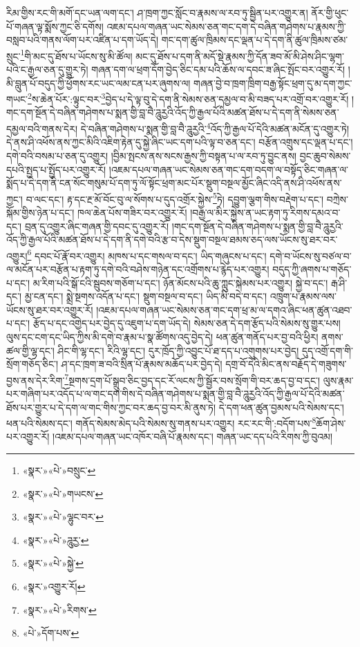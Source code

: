 རིམ་གྱིས་རང་གི་མགོ་དང་ཡན་ལག་དང་། ཤ་ཁྲག་ཀྱང་སློང་བ་རྣམས་ལ་རབ་ཏུ་སྦྱིན་པར་འགྱུར་ན། ནོར་གྱི་ཕུང་པོ་གཞན་ལྟ་སྨོས་ཀྱང་ཅི་དགོས། འཇམ་དཔལ་གཞན་ཡང་སེམས་ཅན་གང་དག་དེ་བཞིན་གཤེགས་པ་རྣམས་ཀྱི་བསླབ་པའི་གནས་ལོག་པར་འཛིན་པ་དག་ཡོད་དེ། གང་དག་ཚུལ་ཁྲིམས་དང་ལྡན་པ་དེ་དག་ནི་ཚུལ་ཁྲིམས་ཙམ་སྲུང་\footnote{«སྣར་»«པེ་»བསྲུང་}གི་མང་དུ་ཐོས་པ་ཡོངས་སུ་མི་ཚོལ། མང་དུ་ཐོས་པ་དག་ནི་མདོ་སྡེ་རྣམས་ཀྱི་དོན་ཟབ་མོ་མི་ཤེས་ཤིང་ལྷག་པའི་ང་རྒྱལ་ཅན་དུ་གྱུར་ཏེ། གཞན་དག་ལ་ཕྲག་དོག་བྱེད་ཅིང་དམ་པའི་ཆོས་ལ་དབང་ཟ་ཞིང་སྤོང་བར་འགྱུར་རོ། །མི་བླུན་པོ་བདུད་ཀྱི་ཕྱོགས་རང་ཡང་ལམ་ངན་པར་ཞུགས་ལ། གཞན་བྱེ་བ་ཁྲག་ཁྲིག་བརྒྱ་སྟོང་ཕྲག་དུ་མ་དག་ཀྱང་གཡང་\footnote{«སྣར་»«པེ་»གཡངས་}ས་ཆེན་པོར་:ལྟུང་བར་\footnote{«སྣར་»«པེ་»ལྷུང་བར་}བྱེད་པ་དེ་ལྟ་བུ་དེ་དག་ནི་སེམས་ཅན་དམྱལ་བ་མི་བཟད་པར་འགྲོ་བར་འགྱུར་རོ། །གང་དག་སྔོན་དེ་བཞིན་གཤེགས་པ་སྨན་གྱི་བླ་བཻ་ཌཱུརྱའི་འོད་ཀྱི་རྒྱལ་པོའི་མཚན་ཐོས་པ་དེ་དག་ནི་སེམས་ཅན་དམྱལ་བའི་གནས་དེར། དེ་བཞིན་གཤེགས་པ་སྨན་གྱི་བླ་བཻ་ཌཱུརྱའི་\footnote{«སྣར་»«པེ་»ཌཱུརྱ་}འོད་ཀྱི་རྒྱལ་པོ་དེའི་མཚན་མངོན་དུ་འགྱུར་ཏེ། དེ་ནས་ཤི་འཕོས་ནས་ཀྱང་མིའི་འཇིག་རྟེན་དུ་སྐྱེ་ཞིང་ཡང་དག་པའི་ལྟ་བ་ཅན་དང་། བརྩོན་འགྲུས་དང་ལྡན་པ་དང་། དགེ་བའི་བསམ་པ་ཅན་དུ་འགྱུར། །བྱིམ་སྤངས་ནས་སངས་རྒྱས་ཀྱི་བསྟན་པ་ལ་རབ་ཏུ་བྱུང་ནས། བྱང་ཆུབ་སེམས་དཔའི་སྤྱད་པ་སྤྱོད་པར་འགྱུར་རོ། །འཇམ་དཔལ་གཞན་ཡང་སེམས་ཅན་གང་དག་བདག་ལ་བསྟོད་ཅིང་གཞན་ལ་སྨོད་པ་དེ་དག་ནི་ངན་སོང་གསུམ་པོ་དག་ཏུ་ལོ་སྟོང་ཕྲག་མང་པོར་སྡུག་བསྔལ་མྱོང་ཞིང་འདི་ནས་ཤི་འཕོས་ནས་ཀྱང་། བ་ལང་དང་། རྟ་དང་རྔ་མོ་བོང་བུ་ལ་སོགས་པ་དུད་འགྲོར་སྐྱེས་\footnote{«སྣར་»«པེ་»སྐྱེ་}ཏེ། དབྱུག་ལྕག་གིས་བརྡེག་པ་དང་། བཀྲེས་སྐོམ་གྱིས་ཉེན་པ་དང་། ཁལ་ཆེན་པོས་གཟིར་བར་འགྱུར་རོ། །བརྒྱ་ལ་མིར་སྐྱེས་ན་ཡང་རྟག་ཏུ་རིགས་དམའ་བ་དང་། བྲན་དུ་འགྱུར་ཞིང་གཞན་གྱི་དབང་དུ་འགྱུར་རོ། །གང་དག་སྔོན་དེ་བཞིན་གཤེགས་པ་སྨན་གྱི་བླ་བཻ་ཌཱུརྱའི་འོད་ཀྱི་རྒྱལ་པོའི་མཚན་ཐོས་པ་དེ་དག་ནི་དགེ་བའི་རྩ་བ་དེས་སྡུག་བསྔལ་ཐམས་ཅད་ལས་ཡོངས་སུ་ཐར་བར་འགྱུར།\footnote{«སྣར་»འགྱུར་རོ།} དབང་པོ་རྣོ་བར་འགྱུར། མཁས་པ་དང་གསལ་བ་དང་། ཡིད་གཞུངས་པ་དང་། དགེ་བ་ཡོངས་སུ་བཙལ་བ་ལ་མངོན་པར་བརྩོན་པ་རྟག་ཏུ་དགེ་བའི་བཤེས་གཉེན་དང་འགྲོགས་པ་རྙེད་པར་འགྱུར། བདུད་ཀྱི་ཞགས་པ་གཅོད་པ་དང་། མ་རིག་པའི་སྒོ་ངའི་སྦུབས་གཅོག་པ་དང་། ཉོན་མོངས་པའི་ཆུ་ཀླུང་སྐེམས་པར་འགྱུར། སྐྱེ་བ་དང་། རྒ་ཤི་དང་། མྱ་ངན་དང་། སྨྲེ་སྔགས་འདོན་པ་དང་། སྡུག་བསྔལ་བ་དང་། ཡིད་མི་བདེ་བ་དང་། འཁྲུག་པ་རྣམས་ལས་ཡོངས་སུ་ཐར་བར་འགྱུར་རོ། །འཇམ་དཔལ་གཞན་ཡང་སེམས་ཅན་གང་དག་ཕྲ་མ་ལ་དགའ་ཞིང་ཕན་ཚུན་འཐབ་པ་དང་། རྩོད་པ་དང་འགྱེད་པར་བྱེད་དུ་འཇུག་པ་དག་ཡོད་དེ། སེམས་ཅན་དེ་དག་རྩོད་པའི་སེམས་སུ་གྱུར་པས། ལུས་དང་ངག་དང་ཡིད་ཀྱིས་མི་དགེ་བ་རྣམ་པ་སྣ་ཚོགས་འདུ་བྱེད་དེ། ཕན་ཚུན་གནོད་པར་བྱ་བའི་ཕྱིར། ནགས་ཚལ་གྱི་ལྷ་དང་། ཤིང་གི་ལྷ་དང་། རིའི་ལྷ་དང་། དུར་ཁྲོད་ཀྱི་འབྱུང་པོ་ཐ་དད་པ་འགུགས་པར་བྱེད། དུད་འགྲོ་དག་གི་སྲོག་གཅོད་ཅིང་། ཤ་དང་ཁྲག་ཟ་བའི་སྲིན་པོ་རྣམས་མཆོད་པར་བྱེད་དེ། དགྲ་བོ་དེའི་མིང་ནས་བརྗོད་དེ་གཟུགས་བྱས་ནས་དེར་རིག་\footnote{«སྣར་»«པེ་»རིགས་}སྔགས་དྲག་པོ་སྒྲུབ་ཅིང་བྱད་དང་རོ་ལངས་ཀྱི་སྦྱོར་བས་སྲོག་གི་བར་ཆད་བྱ་བ་དང་། ལུས་རྣམ་པར་གཞིག་པར་འདོད་པ་ལ་གང་དག་གིས་དེ་བཞིན་གཤེགས་པ་སྨན་གྱི་བླ་བཻ་ཌཱུརྱའི་འོད་ཀྱི་རྒྱལ་པོ་དེའི་མཚན་ཐོས་པར་གྱུར་པ་དེ་དག་ལ་གང་གིས་ཀྱང་བར་ཆད་བྱ་བར་མི་ནུས་ཏེ། དེ་དག་ཕན་ཚུན་བྱམས་པའི་སེམས་དང་། ཕན་པའི་སེམས་དང་། གནོད་སེམས་མེད་པའི་སེམས་སུ་གནས་པར་འགྱུར། རང་རང་གི་:བདོག་པས་\footnote{«པེ་»དོག་པས་}ཆོག་ཤེས་པར་འགྱུར་རོ། །འཇམ་དཔལ་གཞན་ཡང་འཁོར་བཞི་པོ་རྣམས་དང་། གཞན་ཡང་དད་པའི་རིགས་ཀྱི་བུའམ། 